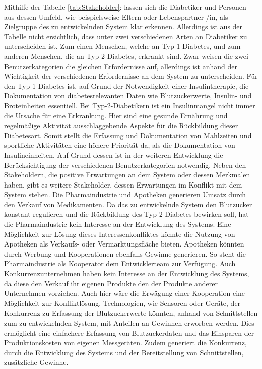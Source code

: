 \documentclass[a4paper,11pt]{article}%
\renewcommand{\\}{\vspace*{0.5\baselineskip} \newline}
\begin{document}
		\setlength{\parindent}{0pt}Mithilfe der Tabelle \ref{tab:Stakeholder}:  lassen sich die Diabetiker und Personen aus dessen Umfeld, wie beispielsweise Eltern oder Lebenspartner-/in, als Zielgruppe des zu entwickelnden System klar erkennen. Allerdings ist aus der Tabelle nicht ersichtlich, dass unter zwei verschiedenen Arten an Diabetiker zu unterscheiden ist. Zum einen Menschen, welche an Typ-1-Diabetes, und zum anderen Menschen, die an Typ-2-Diabetes, erkrankt sind. Zwar weisen die zwei Benutzerkategorien die gleichen Erfordernisse auf, allerdings ist anhand der Wichtigkeit der verschiedenen Erfordernisse an dem System zu unterscheiden. Für den Typ-1-Diabetes ist, auf Grund der Notwendigkeit einer Insulintherapie, die Dokumentation von diabetesrelevanten Daten wie Blutzuckerwerte, Insulin- und Broteinheiten essentiell. Bei Typ-2-Diabetikern ist ein Insulinmangel nicht immer die Ursache für eine Erkrankung. Hier sind eine gesunde Ernährung und regelmäßige Aktivität ausschlaggebende Aspekte für die Rückbildung dieser Diabetesart. Somit stellt die Erfassung und Dokumentation von Mahlzeiten und sportliche Aktivitäten eine höhere Priorität da, als die Dokumentation von Insulineinheiten. Auf Grund dessen ist in der weiteren Entwicklung die Berücksichtigung der verschiedenen Benutzerkategorien notwendig. \\
		Neben den Stakeholdern, die positive Erwartungen an dem System oder dessen Merkmalen haben, gibt es weitere Stakeholder, dessen Erwartungen im Konflikt mit dem System stehen. Die Pharmaindustrie und Apotheken generieren Umsatz durch den Verkauf von Medikamenten. Da das zu entwickelnde System den Blutzucker konstant regulieren und die Rückbildung des Typ-2-Diabetes bewirken soll, hat die Pharmaindustrie kein Interesse an der Entwicklung des Systems. Eine Möglichkeit zur Lösung dieses Interessenkonfliktes könnte die Nutzung von Apotheken als Verkaufs- oder Vermarktungsfläche bieten. Apotheken könnten durch Werbung und Kooperationen ebenfalls Gewinne generieren. So steht die Pharmaindustrie als Kooperator dem Entwicklerteam zur Verfügung. Auch Konkurrenzunternehmen haben kein Interesse an der Entwicklung des Systems, da diese den Verkauf ihr eigenen Produkte den der Produkte anderer Unternehmen vorziehen. Auch hier wäre die Erwägung einer Kooperation eine Möglichkeit zur Konfliktlösung. Technologien, wie Sensoren oder Geräte, der Konkurrenz zu Erfassung der Blutzuckerwerte könnten, anhand von Schnittstellen zum zu entwickelnden System, mit Anteilen an Gewinnen erworben werden. Dies ermöglicht eine einfachere Erfassung von Blutzuckerdaten und das Einsparen der Produktionskosten von eigenen Messgeräten. Zudem generiert die Konkurrenz, durch die Entwicklung des Systems und der Bereitstellung von Schnittstellen, zusätzliche Gewinne.		
\end{document}
